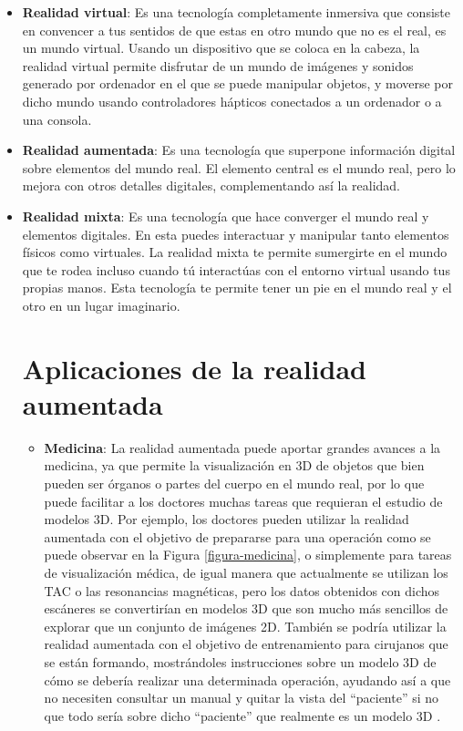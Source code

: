 \begin{itemize}
  \item \textbf{Realidad virtual}: Es una tecnología completamente inmersiva que consiste en convencer a tus sentidos de que estas en otro mundo que no es el real, es un mundo virtual. Usando un dispositivo que se coloca en la cabeza, la realidad virtual permite disfrutar de un mundo de imágenes y sonidos generado por ordenador en el que se puede manipular objetos, y moverse por dicho mundo usando controladores hápticos conectados a un ordenador o a una consola.

  \item \textbf{Realidad aumentada}: Es una tecnología que superpone información digital sobre elementos del mundo real. El elemento central es el mundo real, pero lo mejora con otros detalles digitales, complementando así la realidad.

  \item \textbf{Realidad mixta}: Es una tecnología que hace converger el mundo real y elementos digitales. En esta puedes interactuar y manipular tanto elementos físicos como virtuales. La realidad mixta te permite sumergirte en el mundo que te rodea incluso cuando tú interactúas con el entorno virtual usando tus propias manos. Esta tecnología te permite tener un pie en el mundo real y el otro en un lugar imaginario.
\begin{itemize}

\section{Aplicaciones de la realidad aumentada}
\begin{itemize}
  \item \textbf{Medicina}: La realidad aumentada puede aportar grandes avances a la medicina, ya que permite la visualización en 3D de objetos que bien pueden ser órganos o partes del cuerpo en el mundo real, por lo que puede facilitar a los doctores muchas tareas que requieran el estudio de modelos 3D. Por ejemplo, los doctores pueden utilizar la realidad aumentada con el objetivo de prepararse para una operación como se puede observar en la Figura \ref{figura-medicina}, o simplemente para tareas de visualización médica, de igual manera que actualmente se utilizan los TAC o las resonancias magnéticas, pero los datos obtenidos con dichos escáneres se convertirían en modelos 3D que son mucho más sencillos de explorar que un conjunto de imágenes 2D. También se podría utilizar la realidad aumentada con el objetivo de entrenamiento para cirujanos que se están formando, mostrándoles instrucciones sobre un modelo 3D de cómo se debería realizar una determinada operación, ayudando así a que no necesiten consultar un manual y quitar la vista del “paciente” si no que todo sería sobre dicho “paciente” que realmente es un modelo 3D \cite{azuma}.


\end{itemize}
\end{itemize}
\end{itemize}
